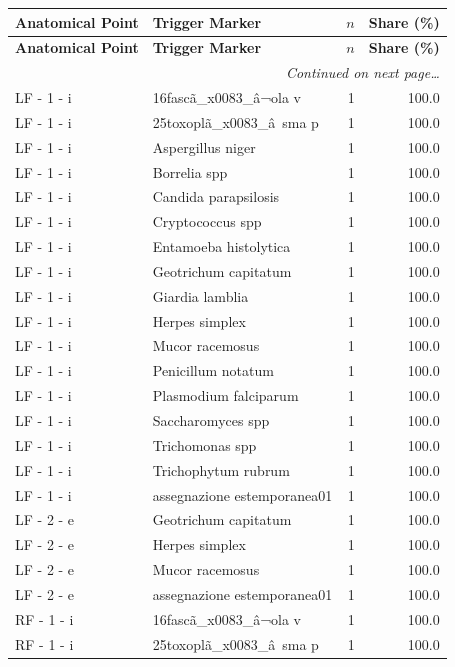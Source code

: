 \documentclass[a4paper,11pt]{article}
\begin{document}
\begin{footnotesize}
\begin{longtable}{p{3.5cm}p{7.5cm}rr}
\toprule
\textbf{Anatomical Point} &
\textbf{Trigger Marker} &
\textbf{$n$} &
\textbf{Share (\%)} \\
\midrule
\endfirsthead
\toprule
\textbf{Anatomical Point} &
\textbf{Trigger Marker} &
\textbf{$n$} &
\textbf{Share (\%)} \\
\midrule
\endhead
\midrule
\multicolumn{4}{r}{\footnotesize\emph{Continued on next page\ldots}} \\
\endfoot
\bottomrule
\endlastfoot
LF - 1 - i & 16fascã\_x0083\_â¬ola v & 1 & 100.0 \\
LF - 1 - i & 25toxoplã\_x0083\_â sma p & 1 & 100.0 \\
LF - 1 - i & Aspergillus niger & 1 & 100.0 \\
LF - 1 - i & Borrelia spp & 1 & 100.0 \\
LF - 1 - i & Candida parapsilosis & 1 & 100.0 \\
LF - 1 - i & Cryptococcus spp & 1 & 100.0 \\
LF - 1 - i & Entamoeba histolytica & 1 & 100.0 \\
LF - 1 - i & Geotrichum capitatum & 1 & 100.0 \\
LF - 1 - i & Giardia lamblia & 1 & 100.0 \\
LF - 1 - i & Herpes simplex & 1 & 100.0 \\
LF - 1 - i & Mucor racemosus & 1 & 100.0 \\
LF - 1 - i & Penicillum notatum & 1 & 100.0 \\
LF - 1 - i & Plasmodium falciparum & 1 & 100.0 \\
LF - 1 - i & Saccharomyces spp & 1 & 100.0 \\
LF - 1 - i & Trichomonas spp & 1 & 100.0 \\
LF - 1 - i & Trichophytum rubrum & 1 & 100.0 \\
LF - 1 - i & assegnazione estemporanea01 & 1 & 100.0 \\
LF - 2 - e & Geotrichum capitatum & 1 & 100.0 \\
LF - 2 - e & Herpes simplex & 1 & 100.0 \\
LF - 2 - e & Mucor racemosus & 1 & 100.0 \\
LF - 2 - e & assegnazione estemporanea01 & 1 & 100.0 \\
RF - 1 - i & 16fascã\_x0083\_â¬ola v & 1 & 100.0 \\
RF - 1 - i & 25toxoplã\_x0083\_â sma p & 1 & 100.0 \\

\end{longtable}
\end{footnotesize}
\end{document}
